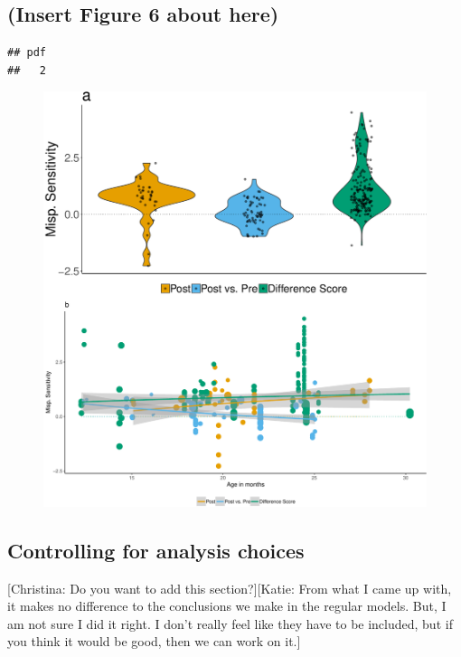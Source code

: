 \documentclass[man]{apa6}
\theoremstyle{definition}
\theoremstyle{definition}
\theoremstyle{definition}
\theoremstyle{remark}
\begin{document}
\subsection{(Insert Figure 6 about
here)}\label{insert-figure-6-about-here}

\begin{verbatim}
## pdf 
##   2
\end{verbatim}

\begin{figure}
\centering
\includegraphics{Paper_Analyses_files/figure-latex/Plot_Within_cond_age_diff_score-1.pdf}
\caption{}
\end{figure}

\subsection{Controlling for analysis
choices}\label{controlling-for-analysis-choices}

{[}Christina: Do you want to add this section?{]}{[}Katie: From what I
came up with, it makes no difference to the conclusions we make in the
regular models. But, I am not sure I did it right. I don't really feel
like they have to be included, but if you think it would be good, then
we can work on it.{]}
\end{document}
